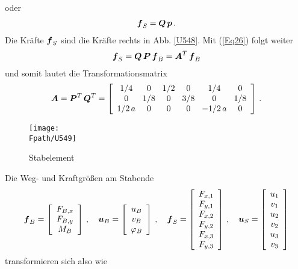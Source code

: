 {oder
\begin{align}
\vek f_S = \vek Q\,\vek p\,.
\end{align}
Die Kr\"{a}fte $\vek f_S$ sind die Kr\"{a}fte rechts in Abb. \ref{U548}.
Mit (\ref{Eq26}) folgt weiter
\begin{align}
\vek f_S = \vek Q\,\vek P\,\vek f_B = \vek A^T\,\vek f_B
\end{align}
und somit lautet die Transformationsmatrix
\begin{align}\label{Eq27}
\vek A = \vek P^T\,\vek Q^T = \left[\barr{c @{\hspace{3mm}} c @{\hspace{3mm}} c @{\hspace{3mm}} c
@{\hspace{3mm}} c @{\hspace{3mm}} c} 1/4 & 0 &1/2 & 0 &1/4 & 0 \\
0 &1/8 & 0 &3/8 &0 &1/8\\
1/2\,a & 0 & 0& 0  &-1/2\,a & 0\earr \right]\,.
\end{align}
\begin{figure}[tbp]
\if {} \sidecaption[t] \fi
\centering
\texttt{[image: \\Fpath/U549]}
\caption{Stabelement }
\label{U549}
\end{figure}%
Die Weg- und Kraftgr\"{o}{\ss}en am Stabende
\begin{align}
\vek f_B = \left[\barr{c} F_{B,x} \\ F_{B,y} \\ M_{B} \earr \right]\,, \quad
\vek u_B = \left[\barr{c} u_B \\ v_B \\ \Np_B \earr \right]\,,\quad
\vek f_S = \left[\barr{c} F_{x,1} \\ F_{y,1} \\ F_{x,2} \\ F_{y,2} \\ F_{x,3} \\ F_{y,3}\earr \right]\,,\quad
\vek u_S = \left[\barr{c} u_1 \\ v_1 \\ u_2 \\ v_2 \\ u_3 \\ v_3 \earr \right]
\end{align}
transformieren sich also wie
\begin{align} \label{Eq990}

\end{align}}
